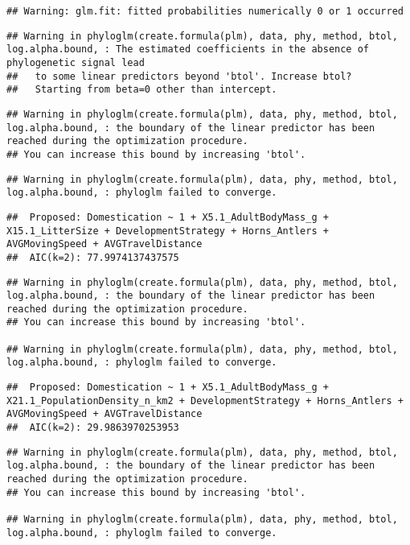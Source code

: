 \documentclass[
]{article}
\begin{document}
\begin{verbatim}
## Warning: glm.fit: fitted probabilities numerically 0 or 1 occurred
\end{verbatim}

\begin{verbatim}
## Warning in phyloglm(create.formula(plm), data, phy, method, btol, log.alpha.bound, : The estimated coefficients in the absence of phylogenetic signal lead
##   to some linear predictors beyond 'btol'. Increase btol?
##   Starting from beta=0 other than intercept.
\end{verbatim}

\begin{verbatim}
## Warning in phyloglm(create.formula(plm), data, phy, method, btol, log.alpha.bound, : the boundary of the linear predictor has been reached during the optimization procedure.
## You can increase this bound by increasing 'btol'.
\end{verbatim}

\begin{verbatim}
## Warning in phyloglm(create.formula(plm), data, phy, method, btol, log.alpha.bound, : phyloglm failed to converge.
\end{verbatim}

\begin{verbatim}
##  Proposed: Domestication ~ 1 + X5.1_AdultBodyMass_g + X15.1_LitterSize + DevelopmentStrategy + Horns_Antlers + AVGMovingSpeed + AVGTravelDistance
##  AIC(k=2): 77.9974137437575
\end{verbatim}

\begin{verbatim}
## Warning in phyloglm(create.formula(plm), data, phy, method, btol, log.alpha.bound, : the boundary of the linear predictor has been reached during the optimization procedure.
## You can increase this bound by increasing 'btol'.

## Warning in phyloglm(create.formula(plm), data, phy, method, btol, log.alpha.bound, : phyloglm failed to converge.
\end{verbatim}

\begin{verbatim}
##  Proposed: Domestication ~ 1 + X5.1_AdultBodyMass_g + X21.1_PopulationDensity_n_km2 + DevelopmentStrategy + Horns_Antlers + AVGMovingSpeed + AVGTravelDistance
##  AIC(k=2): 29.9863970253953
\end{verbatim}

\begin{verbatim}
## Warning in phyloglm(create.formula(plm), data, phy, method, btol, log.alpha.bound, : the boundary of the linear predictor has been reached during the optimization procedure.
## You can increase this bound by increasing 'btol'.

## Warning in phyloglm(create.formula(plm), data, phy, method, btol, log.alpha.bound, : phyloglm failed to converge.
\end{verbatim}
\end{document}

